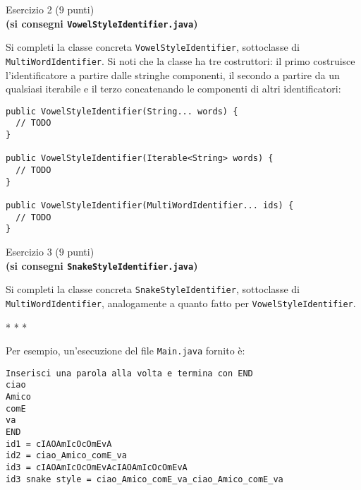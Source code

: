 \documentclass[12pt]{article}
\begin{document}
\vspace*{1ex}
\begin{center}{\Large Esercizio 2} ($9$ punti)\\
  \textbf{(si consegni \texttt{VowelStyleIdentifier.java})}
\end{center}

Si completi la classe concreta \texttt{VowelStyleIdentifier}, sottoclasse
di \texttt{MultiWordIdentifier}. Si noti che la classe ha tre costruttori:
il primo costruisce l'identificatore a partire dalle stringhe componenti,
il secondo a partire da un qualsiasi iterabile e il terzo concatenando le
componenti di altri identificatori:

{\small\begin{verbatim}
public VowelStyleIdentifier(String... words) {
  // TODO
}

public VowelStyleIdentifier(Iterable<String> words) {
  // TODO
}

public VowelStyleIdentifier(MultiWordIdentifier... ids) {
  // TODO
}
\end{verbatim}}

\vspace*{1ex}
\begin{center}{\Large Esercizio 3} ($9$ punti)\\
  \textbf{(si consegni \texttt{SnakeStyleIdentifier.java})}
\end{center}

Si completi la classe concreta \texttt{SnakeStyleIdentifier}, sottoclasse
di \texttt{MultiWordIdentifier}, analogamente a quanto fatto per
\texttt{VowelStyleIdentifier}.

\begin{center}
  * * *
\end{center}

Per esempio, un'esecuzione del file \texttt{Main.java} fornito \`e:

\begin{mdframed}[backgroundcolor=lightgrey] 
\begin{verbatim}
Inserisci una parola alla volta e termina con END
ciao
Amico
comE
va
END
id1 = cIAOAmIcOcOmEvA
id2 = ciao_Amico_comE_va
id3 = cIAOAmIcOcOmEvAcIAOAmIcOcOmEvA
id3 snake style = ciao_Amico_comE_va_ciao_Amico_comE_va
\end{verbatim}
\end{mdframed}
\end{document}
